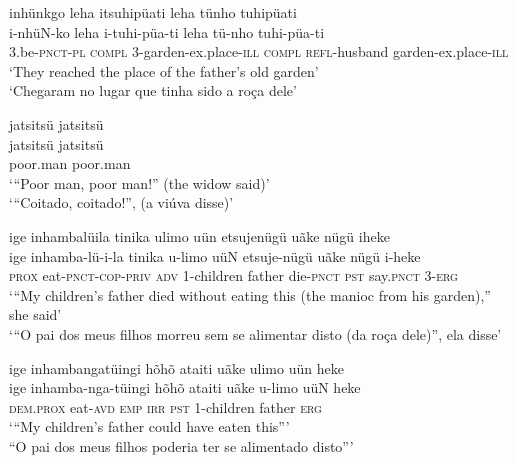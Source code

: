 \documentclass[output=paper,
modfonts,nonflat
]{langsci/langscibook}
\begin{document}
\ea inhünkgo leha  itsuhipüati leha tünho tuhipüati \\[.3em]
\gll i-nhüN-ko	leha		i-tuhi{\footnotemark}-püa{\footnotemark}-ti		 leha	tü-nho		tuhi-püa-ti\\
3.be-\textsc{pnct-pl}	\textsc{compl}  	3-garden-ex.place-\textsc{ill} 	\textsc{compl} \textsc{refl}-husband 	garden-ex.place-\textsc{ill} \\
\glt ‘They reached the place of the father’s old garden’\\
‘Chegaram no lugar que tinha sido a roça dele’\\
\addtocounter{footnote}{-1}
\z

\ea jatsitsü	jatsitsü\\[.3em]
jatsitsü	 jatsitsü \\
poor.man poor.man\\
\glt ‘“Poor man, poor man!” (the widow said)’\\
‘“Coitado, coitado!”, (a viúva disse)’\\
\z

\ea ige inhambalüila tinika ulimo uün etsujenügü uãke nügü iheke\\[.3em]
\gll ige	inhamba-lü-i-la 	tinika	u-limo		uüN etsuje-nügü	uãke 
nügü		i-heke\\
\textsc{prox} 	eat-\textsc{pnct-cop-priv} \textsc{adv} 	1-children 	father die-\textsc{pnct} 		\textsc{pst}
 say.\textsc{pnct}	3-\textsc{erg} \\
\glt ‘“My children’s father died without eating this (the manioc from his garden),” she said’\\
‘“O pai dos meus filhos morreu sem se alimentar disto (da roça dele)”, ela disse’\\
\z

\newpage 
\ea ige inhambangatüingi hõhõ ataiti uãke ulimo uün heke\\[.3em]
\gll ige		inhamba-nga-tüingi	hõhõ	ataiti 	uãke	u-limo		uüN heke\\
\textsc{dem.prox} 	eat-\textsc{avd} 		\textsc{emp} 	\textsc{irr}	\textsc{pst} 	1-children 	father \textsc{erg}\\
\glt ‘“My children’s father could have eaten this”’\\
“O pai dos meus filhos poderia ter se alimentado disto”’\\
\z
\end{document}
